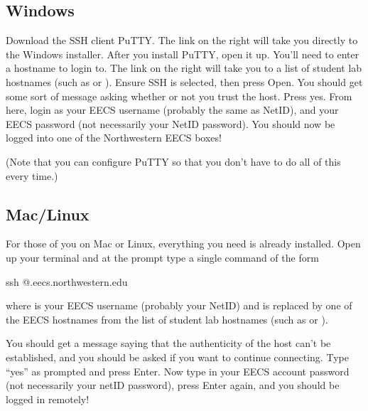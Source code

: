\documentclass{tufte-handout}
\begin{document}
\subsection{Windows}

Download the SSH client PuTTY.%
The link on the right will take you
directly to the Windows installer.
After you install PuTTY, open it up. You'll need to enter a hostname to
login to. The link on the right will take you to a list of student lab
hostnames
(such as 
or
). Ensure SSH is selected, then
press Open. You should get some sort of message asking whether or not
you trust the host. Press yes. From here, login as your EECS username
(probably the same as NetID), and your EECS password (not necessarily
your NetID password). You should now be logged into one of the
Northwestern EECS boxes!

(Note that you can configure PuTTY so that you don't have to do all of
this every time.)

\subsection{Mac/Linux}

For those of you on Mac or Linux, everything you need is already
installed. Open up your terminal and at the prompt
type a single command of the form

\begin{CmdLine}
  \prompt ssh @.eecs.northwestern.edu
\end{CmdLine}

\noindent where  is your EECS username (probably your NetID)
and  is replaced by one of the EECS hostnames from the list
of student lab hostnames%
(such as  or
).

You should get a message saying that the authenticity of the host
can't be established, and you should be asked if you want to continue
connecting.  Type ``yes'' as prompted and press Enter. Now type in your
EECS account password (not necessarily your netID password), press
Enter again, and you should be logged in remotely!
\end{document}
